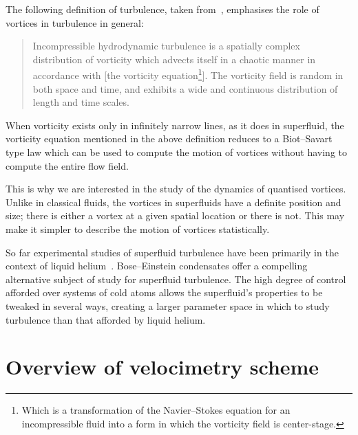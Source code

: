 The following definition of turbulence, taken from~\cite[p 53]{davidson_turbulence:_2004}, emphasises the role of vortices in turbulence in general:
\begin{quote}
Incompressible hydrodynamic turbulence is a spatially complex distribution of vorticity which advects itself in a chaotic manner in accordance with [the vorticity equation\footnote{Which is a transformation of the Navier--Stokes equation for an incompressible fluid into a form in which the vorticity field is center-stage.}]. The vorticity field is random in both space and time, and exhibits a wide and continuous distribution of length and time scales.
\end{quote}

When vorticity exists only in infinitely narrow lines, as it does in superfluid, the vorticity equation mentioned in the above definition reduces to a Biot--Savart type law which can be used to compute the motion of vortices without having to compute the entire flow field.

This is why we are interested in the study of the dynamics of quantised vortices. Unlike in classical fluids, the vortices in superfluids have a definite position and size; there is either a vortex at a given spatial location or there is not. This may make it simpler to describe the motion of vortices statistically.

So far experimental studies of superfluid turbulence have been primarily in the context of liquid helium~\cite{leggett_superfluidity_1999}. Bose--Einstein condensates offer a compelling alternative subject of study for superfluid turbulence. The high degree of control afforded over systems of cold atoms allows the superfluid's properties to be tweaked in several ways, creating a larger parameter space in which to study turbulence than that afforded by liquid helium.

\section{Overview of velocimetry scheme}

